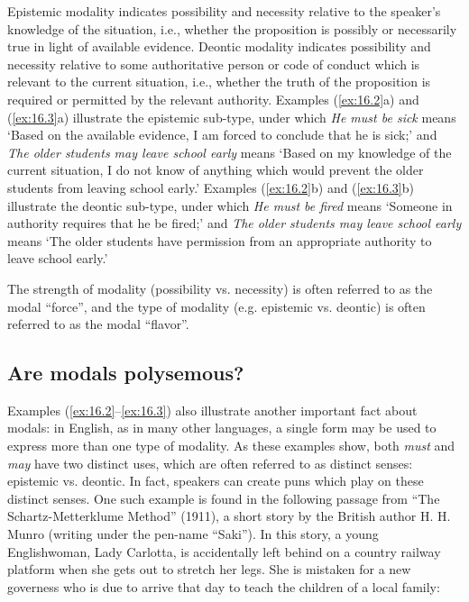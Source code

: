 Epistemic modality indicates possibility and necessity relative to the speaker’s knowledge of the situation, i.e., whether the proposition is possibly or necessarily true in light of available evidence. Deontic modality indicates possibility and necessity relative to some authoritative person or code of conduct which is relevant to the current situation, i.e., whether the truth of the proposition is required or permitted by the relevant authority. Examples (\ref{ex:16.2}a) and (\ref{ex:16.3}a) illustrate the epistemic sub-type, under which \textit{He must be sick} means ‘Based on the available evidence, I am forced to conclude that he is sick;’ and \textit{The older students may leave school early} means ‘Based on my knowledge of the current situation, I do not know of anything which would prevent the older students from leaving school early.’ Examples (\ref{ex:16.2}b) and (\ref{ex:16.3}b) illustrate the deontic sub-type, under which \textit{He must be fired} means ‘Someone in authority requires that he be fired;’ and \textit{The older students may leave school early} means ‘The older students have permission from an appropriate authority to leave school early.’



The strength of modality (possibility vs. necessity) is often referred to as the modal “force”, and the type of modality (e.g. epistemic vs. deontic) is often referred to as the modal “flavor”.


\subsection{Are modals polysemous?}\label{sec:16.2.1}

Examples (\ref{ex:16.2}--\ref{ex:16.3}) also illustrate another important fact about modals: in English, as in many other languages, a single form may be used to express more than one type of modality. As these examples show, both \textit{must} and \textit{may} have two distinct uses, which are often referred to as distinct senses: epistemic vs. deontic. In fact, speakers can create puns which play on these distinct senses. One such example is found in the following passage from “The Schartz-Metterklume Method” (1911), a short story by the British author H. H. Munro (writing under the pen-name “Saki”). In this story, a young Englishwoman, Lady Carlotta, is accidentally left behind on a country railway platform when she gets out to stretch her legs. She is mistaken for a new governess who is due to arrive that day to teach the children of a local family:


